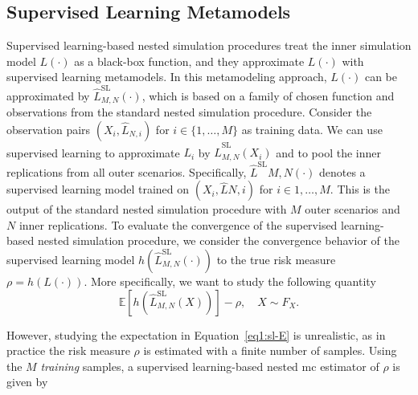 \subsection{Supervised Learning Metamodels}

Supervised learning-based nested simulation procedures treat the inner simulation model $L(\cdot)$ as a black-box function, and they approximate $L(\cdot)$ with supervised learning metamodels.
In this metamodeling approach, $L(\cdot)$ can be approximated by $\hat{L}^{\text{SL}}_{M, N}(\cdot)$, which is based on a family of chosen function and observations from the standard nested simulation procedure.
Consider the observation pairs $(X_i, \hat{L}_{N, i})$ for $i \in \{1, \dots, M\}$ as training data.
We can use supervised learning to approximate $L_i$ by $\hat{L}_{M, N}^{\text{SL}}(X_i)$ and to pool the inner replications from all outer scenarios.
Specifically, $\hat{L}^{\text{SL}}{M, N}(\cdot)$ denotes a supervised learning model trained on $(X_i, \hat{L}{N, i})$ for $i \in {1, \dots, M}$.
This is the output of the standard nested simulation procedure with $M$ outer scenarios and $N$ inner replications.
To evaluate the convergence of the supervised learning-based nested simulation procedure, we consider the convergence behavior of the supervised learning model $h(\hat{L}^{\text{SL}}_{M, N}(\cdot))$ to the true risk measure $\rho = h(L(\cdot))$.
More specifically, we want to study the following quantity
\begin{equation}\label{eq1:sl-E}
    \mathbb{E} \left[ h(\hat{L}^{\text{SL}}_{M, N}(X))   \right] - \rho, \quad X \sim F_X.
\end{equation}

However, studying the expectation in Equation~\eqref{eq1:sl-E} is unrealistic, as in practice the risk measure $\rho$ is estimated with a finite number of samples.
Using the $M$ \textit{training} samples, a supervised learning-based nested \gls{mc} estimator of $\rho$ is given by

